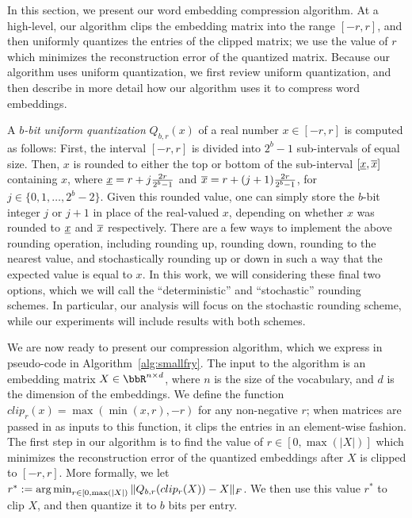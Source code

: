 In this section, we present our word embedding compression algorithm.
At a high-level, our algorithm clips the embedding matrix into the range $[-r,r]$, and then uniformly quantizes the entries of the clipped matrix;
we use the value of $r$ which minimizes the reconstruction error of the quantized matrix.
Because our algorithm uses uniform quantization, we first review uniform quantization, and then describe in more detail how our algorithm uses it to compress word embeddings.

A \textit{$b$-bit uniform quantization} $Q_{b,r}(x)$ of a real number $x \in [-r,r]$ is computed as follows:
First, the interval $[-r,r]$ is divided into $2^b - 1$ sub-intervals of equal size.
Then, $x$ is rounded to either the top or bottom of the sub-interval $[\ulx,\olx]$ containing $x$, where $\ulx = r + j\frac{2r}{2^b-1}$ and $\olx = r + (j+1)\frac{2r}{2^b-1}$, for $j\in\{0,1,\ldots,2^b-2\}$.
Given this rounded value, one can simply store the $b$-bit integer $j$ or $j+1$ in place of the real-valued $x$, depending on whether $x$ was rounded to $\ulx$ and $\olx$ respectively.
There are a few ways to implement the above rounding operation, including rounding up, rounding down, rounding to the nearest value, and stochastically rounding up or down in such a way that the expected value is equal to $x$.
In this work, we will considering these final two options, which we will call the ``deterministic'' and ``stochastic'' rounding schemes.
In particular, our analysis will focus on the stochastic rounding scheme, while our experiments will include results with both schemes.


We are now ready to present our compression algorithm, which we express in pseudo-code in Algorithm~\ref{alg:smallfry}.
The input to the algorithm is an embedding matrix $X \in \RR^{n\times d}$, where $n$ is the size of the vocabulary, and $d$ is the dimension of the embeddings.
We define the function $clip_r(x) = \max(\min(x,r),-r)$ for any non-negative $r$; when matrices are passed in as inputs to this function, it clips the entries in an element-wise fashion.
The first step in our algorithm is to find the value of $r \in [0,\max(|X|)]$ which minimizes the reconstruction error of the quantized embeddings after $X$ is clipped to $[-r,r]$.
More formally, we let $r^* \defeq \argmin_{r \in [0,\max(|X|)} \|Q_{b,r}(clip_r(X))-X\|_F$.
We then use this value $r^*$ to clip $X$, and then quantize it to $b$ bits per entry.

